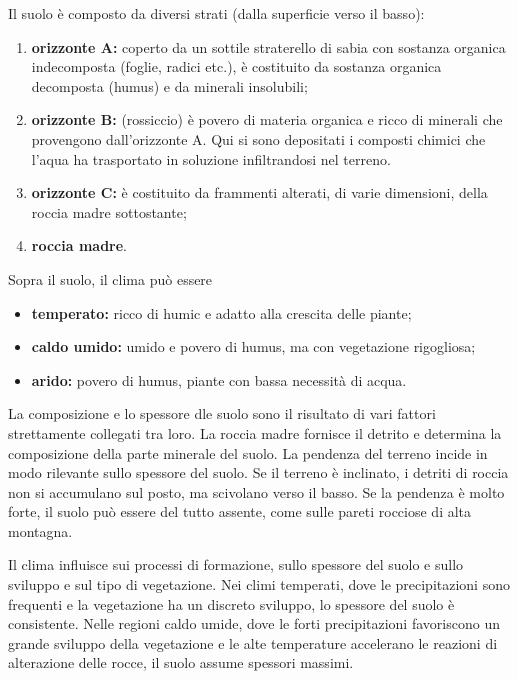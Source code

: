 \documentclass[a4paper]{article}
\begin{document}
Il suolo è composto da diversi strati (dalla superficie verso il basso):
\begin{enumerate}
    \item \textbf{orizzonte A:} coperto da un sottile
        straterello di sabia con sostanza organica indecomposta (foglie, radici etc.),
        è costituito da sostanza organica decomposta (humus) e da minerali insolubili;
    \item \textbf{orizzonte B:} (rossiccio) è povero di materia organica e ricco di minerali che provengono
        dall'orizzonte A. Qui si sono depositati i composti chimici che l'aqua ha trasportato in soluzione infiltrandosi nel terreno.
    \item \textbf{orizzonte C:} è costituito da frammenti alterati, di varie dimensioni, della roccia madre sottostante;
    \item \textbf{roccia madre}.
\end{enumerate}

Sopra il suolo, il clima può essere
\begin{itemize}
    \item \textbf{temperato:} ricco di humic e adatto alla crescita delle piante;
    \item \textbf{caldo umido:} umido e povero di humus, ma con vegetazione rigogliosa;
    \item \textbf{arido:} povero di humus, piante con bassa necessità di acqua.
\end{itemize}

La composizione e lo spessore dle suolo sono il risultato di vari fattori strettamente
collegati tra loro.
La roccia madre fornisce il detrito e determina la composizione della parte minerale del suolo.
La pendenza del terreno incide in modo rilevante sullo spessore del suolo.
Se il terreno è inclinato, i detriti di roccia non si accumulano sul posto, ma scivolano
verso il basso.
Se la pendenza è molto forte, il suolo può essere del tutto assente, come
sulle pareti rocciose di alta montagna.

Il clima influisce sui processi di formazione, sullo spessore del suolo e sullo sviluppo e sul tipo di vegetazione.
Nei climi temperati, dove le precipitazioni sono frequenti e la vegetazione ha un discreto sviluppo,
lo spessore del suolo è consistente.
Nelle regioni caldo umide, dove le forti precipitazioni favoriscono un grande sviluppo della vegetazione
e le alte temperature accelerano le reazioni di alterazione delle rocce, il suolo assume spessori massimi.
\end{document}
